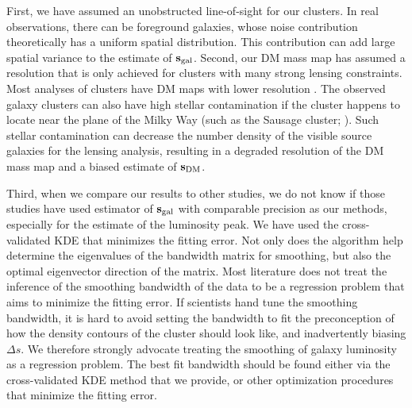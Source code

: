 First, we have assumed an unobstructed line-of-sight for our clusters. 
In real observations, there can be foreground galaxies, whose noise contribution
theoretically has a uniform spatial distribution. 
This contribution can add large spatial variance to the estimate of ${\bf
s}_{\rm gal}$. 
Second, our DM mass map has assumed a resolution that is only achieved for clusters 
with many strong lensing constraints. 
Most analyses of clusters have DM maps with lower resolution . 
The observed galaxy clusters can also have high stellar contamination
if the cluster happens to locate near the plane of the Milky Way 
(such as the Sausage cluster; \citealt{Jee2015}). 
Such stellar contamination can decrease the number density of the visible source galaxies for the
lensing analysis, resulting in a degraded resolution of the DM mass map and a
biased estimate of ${\bf s}_{\rm DM}$. 
  
Third, when we compare our results to other studies, we do not know if 
those studies have used estimator
of ${\bf s}_{\rm gal}$ with comparable precision as our methods, especially for
the estimate of the luminosity peak. We have used the cross-validated KDE that
minimizes the fitting error. Not only does the algorithm help
determine the eigenvalues of the bandwidth matrix for smoothing, 
but also the optimal eigenvector direction of the matrix. 
Most literature does not treat the inference of the smoothing bandwidth 
of the data to be a regression problem that aims to minimize the fitting error.  
If scientists hand tune the smoothing bandwidth, it is hard to
avoid setting the bandwidth to fit the preconception of how the density
contours of the cluster 
should look like, and inadvertently biasing $\Delta s$. We therefore strongly
advocate treating the smoothing of galaxy luminosity as a regression problem.
The best fit bandwidth should be found either via 
the cross-validated KDE method that we provide, or other optimization  
procedures that minimize the fitting error.


